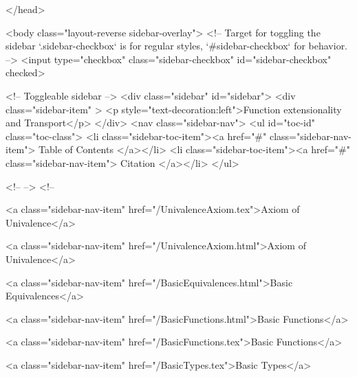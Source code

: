   
</head>




  <body class="layout-reverse sidebar-overlay">
    <!-- Target for toggling the sidebar `.sidebar-checkbox` is for regular
     styles, `#sidebar-checkbox` for behavior. -->
<input type="checkbox" class="sidebar-checkbox" id="sidebar-checkbox" checked>

<!-- Toggleable sidebar -->
<div class="sidebar" id="sidebar">
  <div class="sidebar-item" >
    <p style="text-decoration:left">Function extensionality and Transport</p>
  </div>
  <nav class="sidebar-nav">
    <ul id="toc-id" class="toc-class">
  <li class="sidebar-toc-item"><a href="#" class="sidebar-nav-item"> Table of Contents </a></li>
  <li class="sidebar-toc-item"><a href="#" class="sidebar-nav-item"> Citation </a></li>
</ul>


    <!--  -->
    <!-- 
      
    
      
    
      
    
      
    
      
        
      
    
      
        
          <a class="sidebar-nav-item" href="/UnivalenceAxiom.tex">Axiom of Univalence</a>
        
      
    
      
        
          <a class="sidebar-nav-item" href="/UnivalenceAxiom.html">Axiom of Univalence</a>
        
      
    
      
        
          <a class="sidebar-nav-item" href="/BasicEquivalences.html">Basic Equivalences</a>
        
      
    
      
        
          <a class="sidebar-nav-item" href="/BasicFunctions.html">Basic Functions</a>
        
      
    
      
        
          <a class="sidebar-nav-item" href="/BasicFunctions.tex">Basic Functions</a>
        
      
    
      
        
          <a class="sidebar-nav-item" href="/BasicTypes.tex">Basic Types</a>
        
